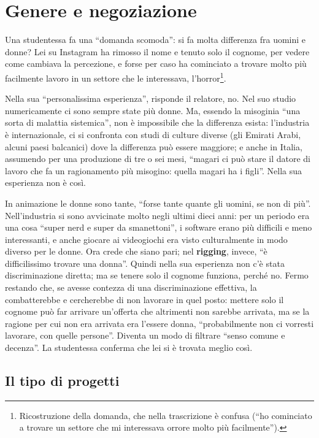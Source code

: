 \section{Genere e negoziazione}
\label{p4:sec:genere}

Una studentessa fa una ``domanda scomoda'': si fa molta differenza fra uomini
e donne? Lei su Instagram ha rimosso il nome e tenuto solo il cognome, per
vedere come cambiava la percezione, e forse per caso ha cominciato a trovare
molto più facilmente lavoro in un settore che le interessava,
l'horror\footnote{Ricostruzione della domanda, che nella trascrizione è
confusa (``ho cominciato a trovare un settore che mi interessava orrore molto
più facilmente'').}.

Nella sua ``personalissima esperienza'', risponde il relatore, no. Nel suo
studio numericamente ci sono sempre state più donne. Ma, essendo la misoginia
``una sorta di malattia sistemica'', non è impossibile che la differenza
esista: l'industria è internazionale, ci si confronta con studi di culture
diverse (gli Emirati Arabi, alcuni paesi balcanici) dove la differenza può
essere maggiore; e anche in Italia, assumendo per una produzione di tre o sei
mesi, ``magari ci può stare il datore di lavoro che fa un ragionamento più
misogino: quella magari ha i figli''. Nella sua esperienza non è così.

In animazione le donne sono tante, ``forse tante quante gli uomini, se non di
più''. Nell'industria si sono avvicinate molto negli ultimi dieci anni: per un
periodo era una cosa ``super nerd e super da smanettoni'', i software erano più
difficili e meno interessanti, e anche giocare ai videogiochi era visto
culturalmente in modo diverso per le donne. Ora crede che siano pari; nel
\textbf{rigging}, invece, ``è difficilissimo trovare una donna''. Quindi
nella sua esperienza non c'è stata discriminazione diretta; ma se tenere solo
il cognome funziona, perché no. Fermo restando che, se avesse contezza di una
discriminazione effettiva, la combatterebbe e cercherebbe di non lavorare in
quel posto: mettere solo il cognome può far arrivare un'offerta che altrimenti
non sarebbe arrivata, ma se la ragione per cui non era arrivata era l'essere
donna, ``probabilmente non ci vorresti lavorare, con quelle persone''. Diventa
un modo di filtrare ``senso comune e decenza''. La studentessa conferma che
lei si è trovata meglio così.

\subsection{Il tipo di progetti}

